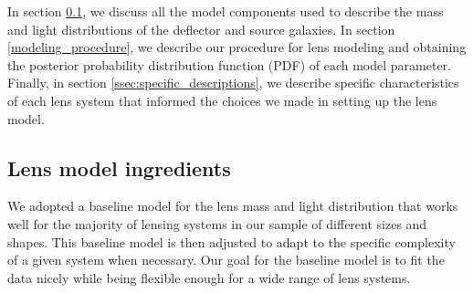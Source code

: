 \documentclass{aa}
\begin{document}
In section \ref{ssec:lens_model_ingredients}, we discuss all the model components used to describe the mass and light distributions of the deflector and source galaxies. In section \ref{modeling_procedure}, we describe our procedure for lens modeling and obtaining the posterior probability distribution function (PDF) of each model parameter. Finally, in section \ref{ssec:specific_descriptions}, we describe specific characteristics of each lens system that informed the choices we made in setting up the lens model.

\subsection{Lens model ingredients}
\label{ssec:lens_model_ingredients}

We adopted a baseline model for the lens mass and light distribution that works well for the majority of lensing systems in our sample of different sizes and shapes. This baseline model is then adjusted to adapt to the specific complexity of a given system when necessary. Our goal for the baseline model is to fit the data nicely while being flexible enough for a wide range of lens systems. %


\end{document}
